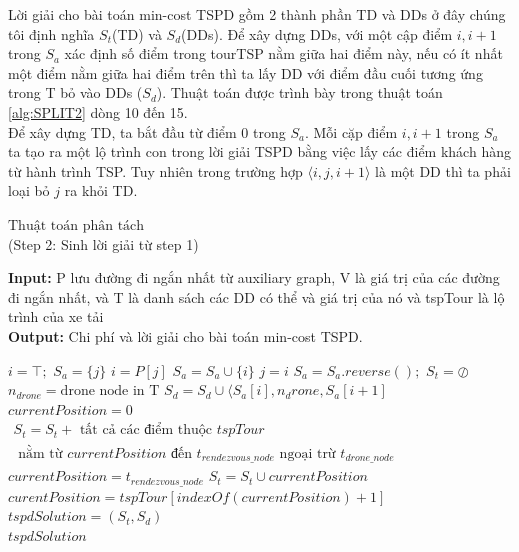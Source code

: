 \documentclass[a4paper,12pt]{report}
\begin{document}
Lời giải cho bài toán min-cost TSPD gồm 2 thành phần TD và DDs ở đây chúng tôi định nghĩa $S_t$(TD) và $S_d$(DDs). Để xây dựng DDs, với một cập điểm $i,i+1$ trong $S_a$ xác định số điểm trong tourTSP nằm giữa hai điểm này, nếu có ít nhất một điểm nằm giữa hai điểm trên thì ta lấy DD với điểm đầu cuối tương ứng trong T bỏ vào DDs ($S_d$). Thuật toán được trình bày trong thuật toán \ref{alg:SPLIT2} dòng 10 đến 15.  \\

Để xây dựng TD, ta bắt đầu từ điểm 0 trong $S_a$. Mỗi cặp điểm $i,i+1$ trong  $S_a$ ta tạo ra một lộ trình con trong lời giải TSPD bằng việc lấy  các điểm khách hàng từ hành trình TSP. Tuy nhiên trong trường hợp $\langle i,j,i+1 \rangle$ là một DD thì ta phải loại bỏ $j$ ra khỏi TD.

\begin{algorithm}
\caption{$\text{Thuật toán phân tách }$ \\ (Step 2: Sinh lời giải từ step 1)}
\textbf{Input:} P lưu đường đi ngắn nhất từ auxiliary graph, V là giá trị của các đường đi ngắn nhất, và T là danh sách các DD có thể và giá trị của nó và tspTour là lộ trình của xe tải\\
\textbf{Output:} Chi phí và lời giải cho bài toán min-cost TSPD.
\begin{algorithmic}[1]
\State $i=\top;$
\State $S_a=\{j\}$
\State $i=P[j]$
\State $S_a=S_a \cup \{i\}$
\State $j=i $  
\EndWhile
\State $S_a=S_a.reverse();$
\State $S_t=\oslash$ 
\State $n_{drone}=\text{drone node in T} $ 
\State $S_d=S_d \cup \langle S_a[i],n_drone,S_a[i+1]$
\EndIf
\EndFor 
\State $currentPosition=0$
\State $\begin{array}{l}  S_t=S_t+ \text{ tất cả các điểm thuộc } tspTour \\ \text{ nằm từ } currentPosition \text{ đến } t_{ rendezvous\_node }\text{ ngoại trừ } t_{ drone\_node } \end{array}$
\State $currentPosition=t_{rendezvous\_node}$
\Else
\State $S_t=S_t \cup currentPosition $
\State $curentPosition=tspTour[indexOf(currentPosition)+1]$
\EndIf
\EndWhile\\
\State $tspdSolution=(S_t,S_d)$\\
\Return $tspdSolution$
\end{algorithmic}
\label{alg:SPLIT2}
\end{algorithm}
\end{document}
